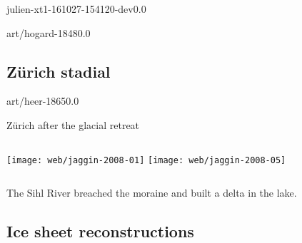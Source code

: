 \documentclass[aspectratio=1610]{beamer}
\begin{document}
    \begin{backgroundframe}[b]{julien-xt1-161027-154120-dev}{0.0}{}
      \flushleft{}
    \end{backgroundframe}

    \begin{backgroundframe}[b]{art/hogard-1848}{0.0}{}
      \flushleft{}
    \end{backgroundframe}


\subsection{Zürich stadial}

    \begin{backgroundframe}[t]{art/heer-1865}{0.0}{}
      \flushleft{}
    \end{backgroundframe}

    \begin{frame}{Zürich after the glacial retreat}
      \begin{columns}
        \column{60mm}
          \texttt{[image: web/jaggin-2008-01]}  %
        \column{60mm}
          \texttt{[image: web/jaggin-2008-05]}  %
      \end{columns}
      \bigskip
      The Sihl River breached the moraine and built a delta in the lake.
    \end{frame}


\subsection{Ice sheet reconstructions}
\end{document}
